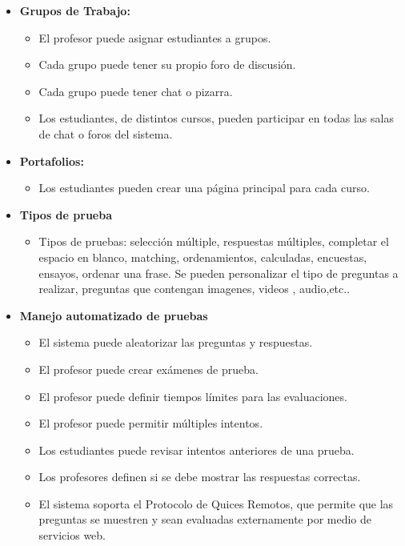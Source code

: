 	\begin{itemize}
		\item \textbf{Grupos de Trabajo:}
			\begin{itemize}
				\item El profesor puede asignar estudiantes a grupos.
				\item Cada grupo puede tener su propio foro de discusión.
				\item Cada grupo puede tener chat o pizarra.
				\item Los estudiantes, de distintos cursos, pueden participar en todas las salas de chat o foros del sistema.
			\end{itemize}
	\end{itemize}
	\begin{itemize}
		\item \textbf{Portafolios:}
			\begin{itemize}
				\item Los estudiantes pueden crear una página principal para cada curso.
			\end{itemize}
	\end{itemize}
	\begin{itemize}
		\item \textbf{Tipos de prueba}
			\begin{itemize}
				\item Tipos de pruebas: selección múltiple, respuestas múltiples, completar el espacio en blanco, matching, ordenamientos, calculadas, encuestas, ensayos, ordenar una frase. Se pueden personalizar el tipo de preguntas a realizar, preguntas que contengan imagenes, videos , audio,etc..
			\end{itemize}
	\end{itemize}
	\begin{itemize}
		\item \textbf{Manejo automatizado de pruebas}
			\begin{itemize}
				\item El sistema puede aleatorizar las preguntas  y respuestas.
				\item El profesor puede crear exámenes de prueba.
				\item El profesor puede definir tiempos límites para las evaluaciones.
				\item El profesor puede permitir múltiples intentos.
				\item Los estudiantes puede revisar intentos anteriores de una prueba.
				\item Los profesores definen si se debe mostrar las respuestas correctas.
				\item El sistema soporta el Protocolo de Quices Remotos, que permite que las preguntas se muestren y sean evaluadas externamente por medio de servicios web.
		\end{itemize}
	\end{itemize}
